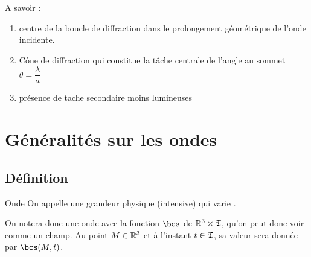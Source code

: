\documentclass[a4paper,french,bookmarks]{book}
\begin{document}
    \begin{minipage}{0.5\linewidth}
        \begin{center}
        \end{center}
    \end{minipage}
    \hfill
    \begin{minipage}{0.5\linewidth}
        A savoir :
        \begin{enumerate}
            \item centre de la boucle de diffraction dans le prolongement géométrique de l'onde incidente.
        
            \item Cône de diffraction qui constitue la tâche centrale de l'angle au sommet $\theta = \dfrac{\lambda}{a}$
            
            \item présence de tache secondaire moins lumineuses
        \end{enumerate}
    \end{minipage}
    
    \section{Généralités sur les ondes}

    \subsection{Définition}
    
    \begin{definition}{Onde}{}
        On appelle  une grandeur physique (intensive) qui varie .
    \end{definition}
    \begin{notation}
        On notera donc une onde avec la fonction $\bcs$ de $\mathbb{R}^3 \times \mathfrak{T}$, qu'on peut donc voir comme un champ. Au point $M \in \mathbb{R}^3$ et à l'instant $t \in \mathfrak{T}$, sa valeur sera donnée par $\bcs\p{M, t}$.
    \end{notation}
        
\end{document}
